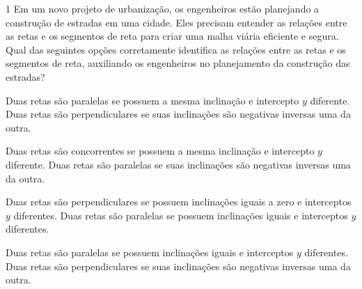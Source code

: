 \num{1} Em um novo projeto de urbanização, os engenheiros estão planejando a
construção de estradas em uma cidade. Eles precisam entender as relações entre
as retas e os segmentos de reta para criar uma malha viária eficiente e segura.
Qual das seguintes opções corretamente identifica as relações entre as retas e
os segmentos de reta, auxiliando os engenheiros no planejamento da construção
das estradas?

\begin{escolha}
\item Duas retas são paralelas se possuem a mesma inclinação e intercepto \(y\) diferente. Duas retas são perpendiculares se suas inclinações são negativas inversas uma da outra.

\item Duas retas são concorrentes se possuem a mesma inclinação e intercepto \(y\) diferente. Duas retas são paralelas se suas inclinações são negativas inversas uma da outra.

\item Duas retas são perpendiculares se possuem inclinações iguais a zero e interceptos \(y\) diferentes. Duas retas são paralelas se possuem inclinações iguais e interceptos \(y\) diferentes.

\item Duas retas são paralelas se possuem inclinações iguais e interceptos \(y\) diferentes. Duas retas são perpendiculares se suas inclinações são negativas inversas uma da outra.
\end{escolha}



